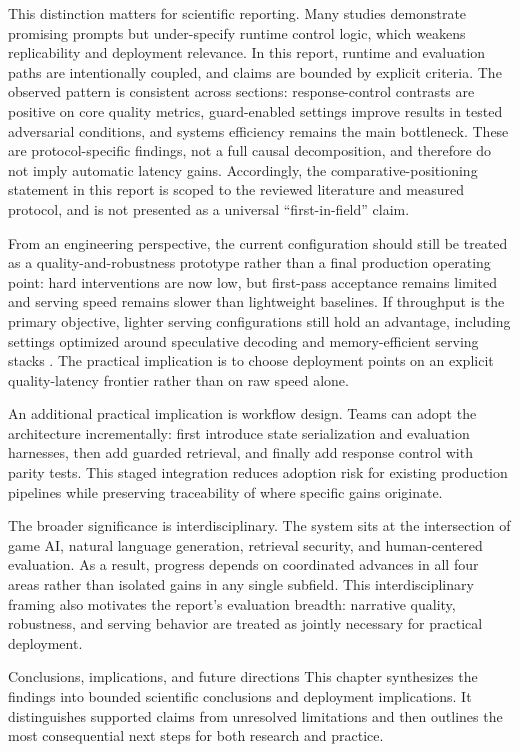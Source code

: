 ﻿\documentclass[a4paper,12pt]{article}
\makeatletter
\let\origsection\section
\renewcommand{\section}{%
  \@ifstar{\origsection*}{%
    \ifnum\value{section}>0
      \clearpage
      \thispagestyle{empty}\null\clearpage
    \else
      \clearpage
    \fi
    \origsection}%
}
\makeatother
\begin{document}
This distinction matters for scientific reporting. Many studies demonstrate promising prompts but under-specify runtime control logic, which weakens replicability and deployment relevance. In this report, runtime and evaluation paths are intentionally coupled, and claims are bounded by explicit criteria. The observed pattern is consistent across sections: response-control contrasts are positive on core quality metrics, guard-enabled settings improve results in tested adversarial conditions, and systems efficiency remains the main bottleneck. These are protocol-specific findings, not a full causal decomposition, and therefore do not imply automatic latency gains.
Accordingly, the comparative-positioning statement in this report is scoped to the reviewed literature and measured protocol, and is not presented as a universal ``first-in-field'' claim.

From an engineering perspective, the current configuration should still be treated as a quality-and-robustness prototype rather than a final production operating point: hard interventions are now low, but first-pass acceptance remains limited and serving speed remains slower than lightweight baselines. If throughput is the primary objective, lighter serving configurations still hold an advantage, including settings optimized around speculative decoding and memory-efficient serving stacks \cite{Leviathan2022SpecDec,Kwon2023vLLM}. The practical implication is to choose deployment points on an explicit quality-latency frontier rather than on raw speed alone.

An additional practical implication is workflow design. Teams can adopt the architecture incrementally: first introduce state serialization and evaluation harnesses, then add guarded retrieval, and finally add response control with parity tests. This staged integration reduces adoption risk for existing production pipelines while preserving traceability of where specific gains originate.

The broader significance is interdisciplinary. The system sits at the intersection of game AI, natural language generation, retrieval security, and human-centered evaluation. As a result, progress depends on coordinated advances in all four areas rather than isolated gains in any single subfield. This interdisciplinary framing also motivates the report's evaluation breadth: narrative quality, robustness, and serving behavior are treated as jointly necessary for practical deployment.

\section{Conclusions, implications, and future directions}
This chapter synthesizes the findings into bounded scientific conclusions and deployment implications. It distinguishes supported claims from unresolved limitations and then outlines the most consequential next steps for both research and practice.
\end{document}
